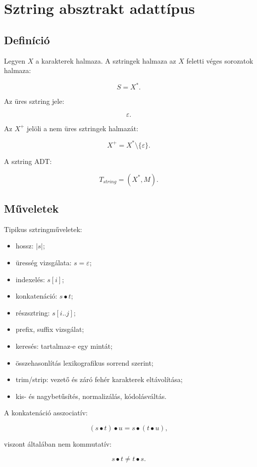 \section{Sztring absztrakt adattípus}

\subsection{Definíció}

Legyen $X$ a karakterek halmaza. A sztringek halmaza az $X$ feletti véges sorozatok halmaza:

\[
S=X^*.
\]

Az üres sztring jele:

\[
\varepsilon.
\]

Az $X^+$ jelöli a nem üres sztringek halmazát:

\[
X^+=X^*\setminus\{\varepsilon\}.
\]

A sztring ADT:

\[
T_{string}=(X^*,M).
\]

\subsection{Műveletek}

Tipikus sztringműveletek:

\begin{itemize}
  \item hossz: $|s|$;
  \item üresség vizsgálata: $s=\varepsilon$;
  \item indexelés: $s[i]$;
  \item konkatenáció: $s\bullet t$;
  \item részsztring: $s[i..j]$;
  \item prefix, suffix vizsgálat;
  \item keresés: tartalmaz-e egy mintát;
  \item összehasonlítás lexikografikus sorrend szerint;
  \item trim/strip: vezető és záró fehér karakterek eltávolítása;
  \item kis- és nagybetűsítés, normalizálás, kódolásváltás.
\end{itemize}

A konkatenáció asszociatív:

\[
(s\bullet t)\bullet u=s\bullet(t\bullet u),
\]

viszont általában nem kommutatív:

\[
s\bullet t\neq t\bullet s.
\]

